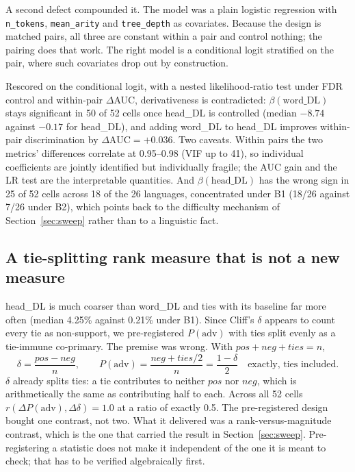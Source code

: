 \documentclass[11pt]{article}
\begin{document}
A second defect compounded it. The model was a plain logistic regression with \texttt{n\_tokens}, \texttt{mean\_arity} and \texttt{tree\_depth} as covariates. Because the design is matched pairs, all three are constant within a pair and control nothing; the pairing does that work. The right model is a conditional logit stratified on the pair, where such covariates drop out by construction.

Rescored on the conditional logit, with a nested likelihood-ratio test under FDR control and within-pair $\Delta$AUC, derivativeness is contradicted: $\beta(\text{word\_DL})$ stays significant in 50 of 52 cells once head\_DL is controlled (median $-8.74$ against $-0.17$ for head\_DL), and adding word\_DL to head\_DL improves within-pair discrimination by $\Delta\text{AUC}=+0.036$. Two caveats. Within pairs the two metrics' differences correlate at 0.95--0.98 (VIF up to 41), so individual coefficients are jointly identified but individually fragile; the AUC gain and the LR test are the interpretable quantities. And $\beta(\text{head\_DL})$ has the wrong sign in 25 of 52 cells across 18 of the 26 languages, concentrated under B1 (18/26 against 7/26 under B2), which points back to the difficulty mechanism of Section~\ref{sec:sweep} rather than to a linguistic fact.

\subsection{A tie-splitting rank measure that is not a new measure}

head\_DL is much coarser than word\_DL and ties with its baseline far more often (median 4.25\% against 0.21\% under B1). Since Cliff's $\delta$ appears to count every tie as non-support, we pre-registered $P(\text{adv})$ with ties split evenly as a tie-immune co-primary. The premise was wrong. With $pos+neg+ties=n$,
\[
\delta=\frac{pos-neg}{n},\qquad P(\text{adv})=\frac{neg+ties/2}{n}=\frac{1-\delta}{2}\quad\text{exactly, ties included.}
\]
$\delta$ already splits ties: a tie contributes to neither $pos$ nor $neg$, which is arithmetically the same as contributing half to each. Across all 52 cells $r(\Delta P(\text{adv}),\Delta\delta)=1.0$ at a ratio of exactly 0.5. The pre-registered design bought one contrast, not two. What it delivered was a rank-versus-magnitude contrast, which is the one that carried the result in Section~\ref{sec:sweep}. Pre-registering a statistic does not make it independent of the one it is meant to check; that has to be verified algebraically first.
\end{document}
